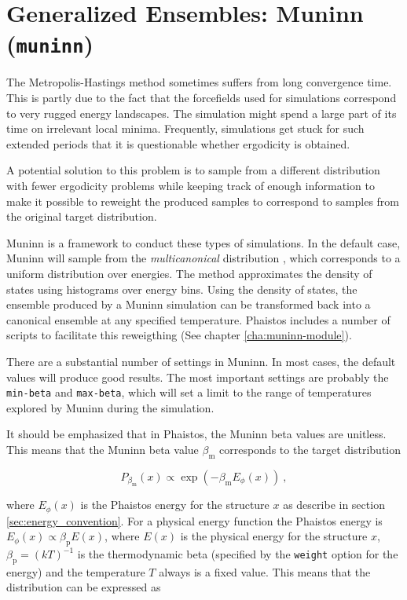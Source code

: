 \section{Generalized Ensembles: Muninn (\texttt{muninn})}
\label{sec:muninn}


The Metropolis-Hastings method sometimes suffers from long convergence
time. This is partly due to the fact that the forcefields used for
simulations correspond to very rugged energy landscapes. The
simulation might spend a large part of its time on irrelevant local
minima. Frequently, simulations get stuck for such extended periods that it
is questionable whether ergodicity is obtained.

A potential solution to this problem is to sample from a different
distribution with fewer ergodicity problems while keeping track of
enough information to make it possible to reweight the produced samples to
correspond to samples from the original target distribution.

Muninn is a framework to conduct these types of simulations. In the
default case, Muninn will sample from the \emph{multicanonical}
distribution \cite{berg1992multicanonical}, which corresponds to a uniform distribution over
energies. The method approximates the density of states using
histograms over energy bins. Using the density of states, the ensemble
produced by a Muninn simulation can be transformed back into a
canonical ensemble at any specified temperature. Phaistos includes a
number of scripts to facilitate this reweigthing (See chapter
\ref{cha:muninn-module}).

There are a substantial number of settings in Muninn. In most cases,
the default values will produce good results. The most important
settings are probably the \texttt{min-beta} and \texttt{max-beta},
which will set a limit to the range of temperatures explored by Muninn
during the simulation.

It should be emphasized that in Phaistos, the Muninn beta values are
unitless. This means that the Muninn beta value $\beta_{\mathrm{m}}$
corresponds to the target distribution

\begin{equation}
P_{\beta_{\mathrm{m}}}(x) \propto \exp (-\beta_{\mathrm{m}} E_{\phi}(x) )\ ,
\end{equation}

\noindent where $E_{\phi}(x)$ is the Phaistos energy for the structure
$x$ as describe in section \ref{sec:energy_convention}. For a physical
energy function the Phaistos energy is $E_{\phi}(x) \propto
\beta_{\mathrm{p}} E(x)$, where $E(x)$ is the physical energy for the
structure $x$, $\beta_{\mathrm{p}} = (kT)^{-1}$ is the thermodynamic
beta (specified by the \texttt{weight} option for the energy) and the
temperature $T$ always is a fixed value. This means that the
distribution can be expressed as


